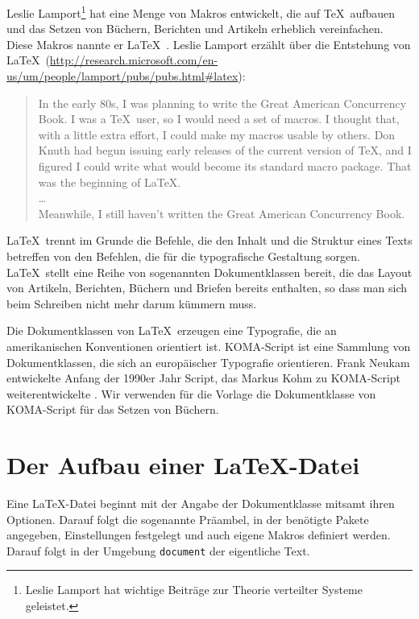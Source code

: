 Leslie Lamport\footnote{ Leslie Lamport hat wichtige Beiträge zur
Theorie verteilter Systeme geleistet.} hat eine Menge von Makros
entwickelt, die auf \TeX\ aufbauen und das Setzen von Büchern, Berichten
und Artikeln erheblich vereinfachen. Diese Makros nannte er \LaTeX\
\cite{lamport94}.  Leslie Lamport erzählt über die Entstehung  von
\LaTeX\
(\url{http://research.microsoft.com/en-us/um/people/lamport/pubs/pubs.html#latex}):

\begin{quote}
In the early 80s, I was planning to write the Great American Concurrency
Book.  I was a \TeX\ user, so I would need a set of macros.  I thought
that, with a little extra effort, I could make my macros usable by
others.  Don Knuth had begun issuing early releases of the current
version of \TeX, and I figured I could write what would become its
standard macro package.  That was the beginning of \LaTeX. 	\\
\dots\\
Meanwhile, I still haven't written the Great American Concurrency
Book.
\end{quote}

\LaTeX\ trennt im Grunde die Befehle, die den Inhalt und die Struktur
eines Texts betreffen von den Befehlen, die für die typografische
Gestaltung sorgen.  \LaTeX\ stellt eine Reihe von sogenannten
Dokumentklassen bereit, die das Layout von Artikeln, Berichten, Büchern
und Briefen bereits enthalten, so dass man sich beim Schreiben nicht
mehr darum kümmern muss.

Die Dokumentklassen von \LaTeX\ erzeugen eine Typografie, die an
amerikanischen Konventionen orientiert ist. \textsf{KOMA-Script} ist eine
Sammlung von Dokumentklassen, die sich an europäischer Typografie
orientieren. Frank Neukam entwickelte Anfang der 1990er Jahr
\textsf{Script}, das Markus Kohm zu \textsf{KOMA-Script}
weiterentwickelte \cite{koma16}. Wir verwenden für die Vorlage die
Dokumentklasse von \textsf{KOMA-Script} für das Setzen von Büchern.

\section{Der Aufbau einer \LaTeX-Datei}
\label{sec:aufbau}

Eine \LaTeX-Datei beginnt mit der Angabe der Dokumentklasse mitsamt
ihren Optionen. Darauf folgt die sogenannte Präambel, in der benötigte
Pakete angegeben, Einstellungen festgelegt und auch eigene Makros
definiert werden. Darauf folgt in der Umgebung \verb=document= der
eigentliche Text.

